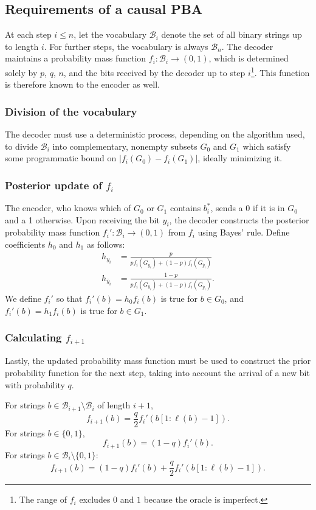 \documentclass{IEEEtran}
\begin{document}
\subsection{Requirements of a causal PBA}
\label{ssec:reqs}
At each step $i \leq n$, let the vocabulary $\mathcal{B}_i$
denote the set of all binary strings up to length $i$. For further steps,
the vocabulary is always $\mathcal{B}_n$. The decoder maintains a probability
mass function $f_i\colon\mathcal{B}_i \to (0,1)$,
which is determined solely by
$p$, $q$, $n$, and the bits received by the decoder
up to step $i$\footnote{The range of $f_i$ excludes
$0$ and $1$ because the oracle is imperfect.}. This
function is therefore known to the encoder as well.
\subsubsection{Division of the vocabulary}
The decoder must use a deterministic process, depending on the algorithm
used, to divide $\mathcal{B}_i$ into
complementary, nonempty subsets $G_0$ and $G_1$ which satisfy some programmatic
bound on $|f_i(G_0)-f_i(G_1)|$, ideally minimizing it.
\subsubsection{Posterior update of $f_i$}
The encoder, who knows which of $G_0$ or $G_1$ contains $b_i^*$, sends
a 0 if it is in $G_0$ and a 1 otherwise. Upon receiving the bit $y_i$,
the decoder constructs the posterior probability mass function
$f_i'\colon \mathcal{B}_i\to(0,1)$
from $f_i$ using
Bayes' rule.
Define coefficients
$h_0$ and $h_1$ as follows:
\begin{align}
h_{y_i} &=\frac{p}{pf_i(G_{y_i})+(1-p)f_i(G_{\bar{y}_i})}\\
h_{\bar{y}_i} &= \frac{1-p}{pf_i(G_{y_i})+(1-p)f_i(G_{\bar{y}_i})}.
\end{align}
We define $f_i'$ so that
$f_i'(b)=h_0f_i(b)$ is true for $b \in G_0$, and $f_i'(b)=h_1f_i(b)$ is
true for $b \in G_1$.
\subsubsection{Calculating $f_{i+1}$}
Lastly, the updated probability mass function must be used to construct
the prior probability function for the next step, taking into account the
arrival of a new bit with probability $q$.

For strings $b \in \mathcal{B}_{i+1}\setminus\mathcal{B}_i$ of length
$i+1$,
\begin{equation}
f_{i+1}(b)=\frac{q}{2}f_i'(b[1:\ell(b)-1]).
\end{equation}
For strings $b \in \{0,1\}$,
\begin{equation}
f_{i+1}(b)= (1-q)f_i'(b).
\end{equation}
For strings $b \in \mathcal{B}_i\setminus\{0,1\}$:
\begin{equation}
f_{i+1}(b)=(1-q)f_i'(b)+\frac{q}{2}f_i'(b[1:\ell(b)-1]).
\end{equation}
\end{document}
